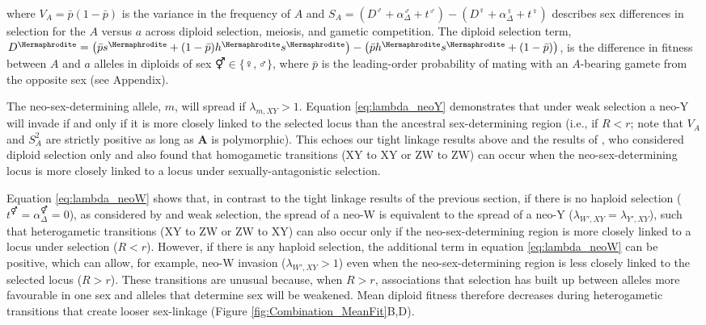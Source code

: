 \documentclass[12pt]{article}
\begin{document}
\noindent
where $V_{A}=\bar{p}(1-\bar{p})$ is the variance in the frequency of $A$ and $S_{A}=(D^\male +\alpha_{\Delta}^\male+t^\male) - (D^\female+\alpha_{\Delta}^\female+t^\female)$ describes sex differences in selection for the $A$ versus $a$ across diploid selection, meiosis, and gametic competition.
The diploid selection term, $D^\Hermaphrodite=\big{(} \bar{p}s^\Hermaphrodite+(1-\bar{p})h^\Hermaphrodite s^\Hermaphrodite\big{)} -\big{(} \bar{p}h^\Hermaphrodite s^\Hermaphrodite+(1-\bar{p}) \big{)}$, is the difference in fitness between $A$ and $a$ alleles in diploids of sex $\Hermaphrodite \in \{\female,\male\}$, where $\bar{p}$ is the leading-order probability of mating with an $A$-bearing gamete from the opposite sex (see Appendix). 


The neo-sex-determining allele, $m$, will spread if $\lambda_{m,XY}>1$. 
Equation \eqref{eq:lambda_neoY} demonstrates that under weak selection a neo-Y will invade if and only if it is more closely linked to the selected locus than the ancestral sex-determining region (i.e., if $R<r$; note that $V_{A}$ and $S_{A}^2$ are strictly positive as long as \textbf{A} is polymorphic). 
This echoes our tight linkage results above and the results of \citet{vanDoorn:2007eu}, who considered diploid selection only and also found that homogametic transitions (XY to XY or ZW to ZW) can occur when the neo-sex-determining locus is more closely linked to a locus under sexually-antagonistic selection. 

Equation \eqref{eq:lambda_neoW} shows that, in contrast to the tight linkage results of the previous section, if there is no haploid selection ($t^\Hermaphrodite=\alpha^\Hermaphrodite_{\Delta}=0$), as considered by \citet{vanDoorn:2010hu} and weak selection, the spread of a neo-W is equivalent to the spread of a neo-Y ($\lambda_{W',XY}=\lambda_{Y',XY}$), such that heterogametic transitions (XY to ZW or ZW to XY) can also occur only if the neo-sex-determining region is more closely linked to a locus under selection ($R<r$). 
However, if there is any haploid selection, the additional term in equation \eqref{eq:lambda_neoW} can be positive, which can allow, for example, neo-W invasion ($\lambda_{W',XY}>1$) even when the neo-sex-determining region is less closely linked to the selected locus ($R>r$). 
These transitions are unusual because, when $R>r$, associations that selection has built up between alleles more favourable in one sex and alleles that determine sex will be weakened. 
Mean diploid fitness therefore decreases during heterogametic transitions that create looser sex-linkage (Figure \ref{fig:Combination_MeanFit}B,D). 
\end{document}
